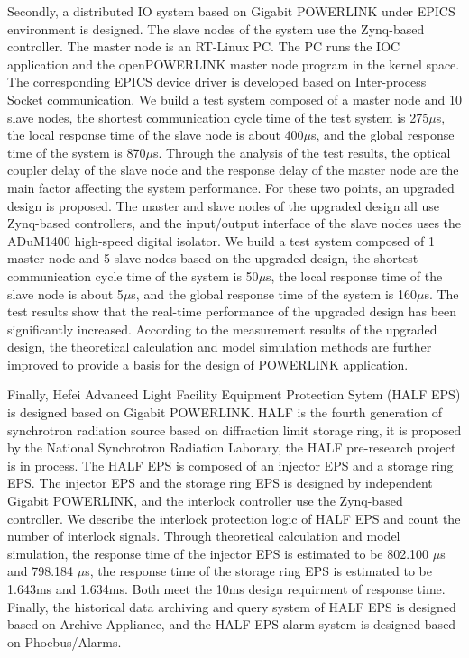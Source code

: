 \begin{enabstract}
Secondly, a distributed IO system based on Gigabit POWERLINK under EPICS environment is designed. The slave nodes of the system use the Zynq-based controller. The master node is an RT-Linux PC. The PC runs the IOC application and the openPOWERLINK master node program in the kernel space. The corresponding EPICS device driver is developed based on Inter-process Socket communication. We build a test system composed of a master node and 10 slave nodes, the shortest communication cycle time of the test system is 275$\mu$s, the local response time of the slave node is about 400$\mu$s, and the global response time of the system is 870$\mu$s. Through the analysis of the test results, the optical coupler delay of the slave node and the response delay of the master node are the main factor affecting the system performance. For these two points, an upgraded design is proposed. The master and slave nodes of the upgraded design all use Zynq-based controllers, and the input/output interface of the slave nodes uses the ADuM1400 high-speed digital isolator. We build a test system composed of 1 master node and 5 slave nodes based on the upgraded design, the shortest communication cycle time of the system is 50$\mu$s, the local response time of the slave node is about 5$\mu$s, and the global response time of the system is 160$\mu$s. The test results show that the real-time performance of the upgraded design has been significantly increased. According to the measurement results of the upgraded design, the theoretical calculation and model simulation methods are further improved to provide a basis for the design of POWERLINK application.

Finally, Hefei Advanced Light Facility Equipment Protection Sytem (HALF EPS) is designed based on Gigabit POWERLINK. HALF is the fourth generation of synchrotron radiation source based on diffraction limit storage ring, it is proposed by the National Synchrotron Radiation Laborary, the HALF pre-research project is in process. The HALF EPS is composed of an injector EPS and a storage ring EPS. The injector EPS and the storage ring EPS is designed by independent Gigabit POWERLINK, and the interlock controller use the Zynq-based controller. We describe the interlock protection logic of HALF EPS and count the number of interlock signals. Through theoretical calculation and model simulation, the response time of the injector EPS is estimated to be 802.100 $\mu$s and 798.184 $\mu$s, the response time of the storage ring EPS is estimated to be 1.643ms and 1.634ms. Both meet the 10ms design requirment of response time. Finally, the historical data archiving and query system of HALF EPS is designed based on Archive Appliance, and the HALF EPS alarm system is designed based on Phoebus/Alarms.

\end{enabstract}
